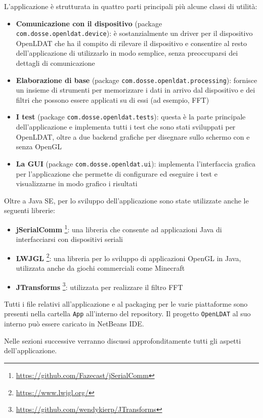 L'applicazione è strutturata in quattro parti principali più alcune classi di utilità:
\begin{itemize}
	\item \textbf{Comunicazione con il dispositivo} (package \texttt{com.dosse.openldat.device}): è sostanzialmente un driver per il dispositivo OpenLDAT che ha il compito di rilevare il dispositivo e consentire al resto dell'applicazione di utilizzarlo in modo semplice, senza preoccuparsi dei dettagli di comunicazione
	\item \textbf{Elaborazione di base} (package \texttt{com.dosse.openldat.processing}): fornisce un insieme di strumenti per memorizzare i dati in arrivo dal dispositivo e dei filtri che possono essere applicati su di essi (ad esempio, FFT)
	\item \textbf{I test} (package \texttt{com.dosse.openldat.tests}): questa è la parte principale dell'applicazione e implementa tutti i test che sono stati sviluppati per OpenLDAT, oltre a due backend grafiche per disegnare sullo schermo con e senza OpenGL
	\item \textbf{La GUI} (package \texttt{com.dosse.openldat.ui}): implementa l'interfaccia grafica per l'applicazione che permette di configurare ed eseguire i test e visualizzarne in modo grafico i risultati
\end{itemize}

Oltre a Java SE, per lo sviluppo dell'applicazione sono state utilizzate anche le seguenti librerie:
\begin{itemize}
	\item \textbf{jSerialComm} \footnote{\url{https://github.com/Fazecast/jSerialComm}}: una libreria che consente ad applicazioni Java di interfacciarsi con dispositivi seriali
	\item \textbf{LWJGL} \footnote{\url{https://www.lwjgl.org/}}: una libreria per lo sviluppo di applicazioni OpenGL in Java, utilizzata anche da giochi commerciali come Minecraft
	\item \textbf{JTransforms} \footnote{\url{https://github.com/wendykierp/JTransforms}}: utilizzata per realizzare il filtro FFT
\end{itemize}

Tutti i file relativi all'applicazione e al packaging per le varie piattaforme sono presenti nella cartella \texttt{App} all'interno del repository. Il progetto \texttt{OpenLDAT} al suo interno può essere caricato in NetBeans IDE.

Nelle sezioni successive verranno discussi approfonditamente tutti gli aspetti dell'applicazione.

